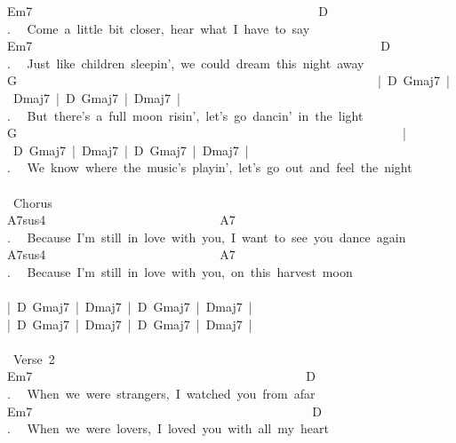 {Em7\ \ \ \ \ \ \ \ \ \ \ \ \ \ \ \ \ \ \ \ \ \ \ \ \ \ \ \ \ \ \ \ \ \ \ \ \ \ \ \ \ \ \ \ \ \ D\\
. \ \ Come\ a\ little\ bit\ closer,\ hear\ what\ I\ have\ to\ say\\
Em7\ \ \ \ \ \ \ \ \ \ \ \ \ \ \ \ \ \ \ \ \ \ \ \ \ \ \ \ \ \ \ \ \ \ \ \ \ \ \ \ \ \ \ \ \ \ \ \ \ \ \ \ \ \ \ \ D\\
. \ \ Just\ like\ children\ sleepin',\ we\ could\ dream\ this\ night\ away\\
G\ \ \ \ \ \ \ \ \ \ \ \ \ \ \ \ \ \ \ \ \ \ \ \ \ \ \ \ \ \ \ \ \ \ \ \ \ \ \ \ \ \ \ \ \ \ \ \ \ \ \ \ \ \ \ \ \ \ |\ D\ Gmaj7\ |\ Dmaj7\ |\ D\ Gmaj7\ |\ Dmaj7\ |\\
. \ \ But\ there's\ a\ full\ moon\ risin',\ let's\ go\ dancin'\ in\ the\ light\\
G\ \ \ \ \ \ \ \ \ \ \ \ \ \ \ \ \ \ \ \ \ \ \ \ \ \ \ \ \ \ \ \ \ \ \ \ \ \ \ \ \ \ \ \ \ \ \ \ \ \ \ \ \ \ \ \ \ \ \ \ \ \ |\ D\ Gmaj7\ |\ Dmaj7\ |\ D\ Gmaj7\ |\ Dmaj7\ |\\
. \ \ We\ know\ where\ the\ music's\ playin',\ let's\ go\ out\ and\ feel\ the\ night\\
\\
\lbrack\ Chorus\rbrack\\
A7sus4\ \ \ \ \ \ \ \ \ \ \ \ \ \ \ \ \ \ \ \ \ \ \ \ \ \ \ \ A7\\
. \ \ Because\ I'm\ still\ in\ love\ with\ you,\ I\ want\ to\ see\ you\ dance\ again\\
A7sus4\ \ \ \ \ \ \ \ \ \ \ \ \ \ \ \ \ \ \ \ \ \ \ \ \ \ \ \ A7\ \ \ \ \ \ \ \ \ \ \ \ \ \ \ \ \ \ \ \\
. \ \ Because\ I'm\ still\ in\ love\ with\ you,\ on\ this\ harvest\ moon\\
\\
|\ D\ Gmaj7\ |\ Dmaj7\ |\ D\ Gmaj7\ |\ Dmaj7\ |\\
|\ D\ Gmaj7\ |\ Dmaj7\ |\ D\ Gmaj7\ |\ Dmaj7\ |\\
\\
\lbrack\ Verse\ 2\rbrack\\
Em7\ \ \ \ \ \ \ \ \ \ \ \ \ \ \ \ \ \ \ \ \ \ \ \ \ \ \ \ \ \ \ \ \ \ \ \ \ \ \ \ \ \ \ \ D\\
. \ \ When\ we\ were\ strangers,\ I\ watched\ you\ from\ afar\\
Em7\ \ \ \ \ \ \ \ \ \ \ \ \ \ \ \ \ \ \ \ \ \ \ \ \ \ \ \ \ \ \ \ \ \ \ \ \ \ \ \ \ \ \ \ \ D\\
. \ \ When\ we\ were\ lovers,\ I\ loved\ you\ with\ all\ my\ heart\\
}
